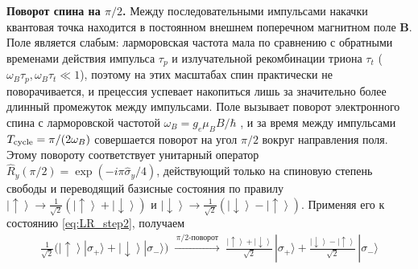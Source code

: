 \documentclass[11pt]{article}    %
\numberwithin{equation}{section}
\begin{document}
\textbf{Поворот спина на $\pi/2$.}
Между последовательными импульсами накачки квантовая точка находится
в постоянном внешнем поперечном магнитном поле $\mathbf{B}$.
Поле является слабым: ларморовская частота мала по сравнению с
обратными временами действия импульса $\tau_p$ и излучательной
рекомбинации триона $\tau_t$ ($\omega_B \tau_p, \omega_B \tau_t \ll 1$),
поэтому на этих масштабах спин практически не поворачивается, и
прецессия успевает накопиться лишь за значительно более длинный
промежуток между импульсами.
Поле вызывает поворот электронного спина с ларморовской частотой
$\omega_B = g_e \mu_B B / \hbar$ \cite{yugova2009}, и за время между импульсами
$T_{\rm cycle} = \pi/(2\omega_B)$ совершается поворот на угол $\pi/2$
вокруг направления поля. Этому повороту соответствует унитарный
оператор $\hat R_y(\pi/2) = \exp(-i\pi \hat\sigma_y/4)$, действующий
только на спиновую степень свободы и переводящий базисные состояния
по правилу $\left|\uparrow\right\rangle \to
\tfrac{1}{\sqrt{2}}(\left|\uparrow\right\rangle
+ \left|\downarrow\right\rangle)$ и
$\left|\downarrow\right\rangle \to
\tfrac{1}{\sqrt{2}}(\left|\downarrow\right\rangle
- \left|\uparrow\right\rangle)$. Применяя его к
состоянию \eqref{eq:LR_step2}, получаем
\begin{gather}
    \frac{1}{\sqrt{2}}\bigl(\left|\uparrow\right\rangle|\sigma_+\rangle
    + \left|\downarrow\right\rangle|\sigma_-\rangle\bigr)
    \;\xrightarrow{\,\pi/2\text{-поворот}\,}\;
    \frac{\left|\uparrow\right\rangle + \left|\downarrow\right\rangle}
    {\sqrt{2}}\,|\sigma_+\rangle
    + \frac{\left|\downarrow\right\rangle - \left|\uparrow\right\rangle}
    {\sqrt{2}}\,|\sigma_-\rangle
    \label{eq:LR_step3}
\end{gather}
\end{document}
